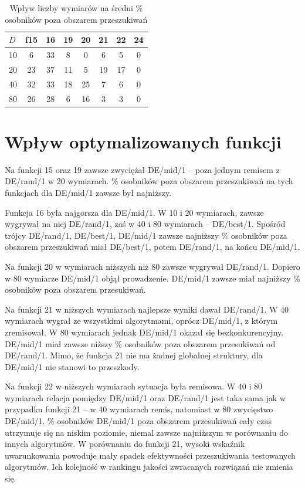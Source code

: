 \documentclass[a4paper,onecolumn,oneside,11pt,wide,floatssmall]{mwrep}
\theoremstyle{definition}
\theoremstyle{plain}%
\theoremstyle{remark}
\begin{document}
\begin{table}[H]
\centering
\begin{tabular}{ l | c | c | c | c | c | c | c }
$D$ &f15& 16& 19& 20& 21& 22& 24 \\ \hline
10              & 6 & 33 &  8 &  0 & 6 & 5 & 0 \\
20              & 23 & 37 & 11&  5 & 19 & 17 & 0 \\
40		& 32 & 33 & 18 & 25 & 7 & 6 & 0 \\
80		& 26 & 28 & 6 & 16 & 3 & 3 & 0 \\
\end{tabular}
\caption{Wpływ liczby wymiarów na średni \% osobników poza obszarem przeszukiwań}
\end{table}

\section{Wpływ optymalizowanych funkcji}

Na funkcji 15 oraz 19 zawsze zwyciężał DE/mid/1 -- poza jednym remisem z DE/rand/1 w 20 wymiarach.
\% osobników poza obszarem przeszukiwań na tych funkcjach dla DE/mid/1 zawsze był najniższy.

Funkcja 16 była najgorsza dla DE/mid/1. W 10 i 20 wymiarach, zawsze wygrywał na niej DE/rand/1,
zaś w 40 i 80 wymiarach -- DE/best/1. Spośród trójcy DE/rand/1, DE/best/1, DE/mid/1 
zawsze najniższy \% osobników poza obszarem przeszukiwań miał DE/best/1, potem DE/rand/1, na końcu
DE/mid/1. 

Na funkcji 20 w wymiarach niższych niż 80 zawsze wygrywał DE/rand/1. Dopiero w 80 wymiarze DE/mid/1
objął prowadzenie. DE/mid/1 zawsze miał najniższy \% osobników poza obszarem przesukiwań.

Na funkcji 21 w niższych wymiarach najlepsze wyniki dawał DE/rand/1. W 40 wymiarach wygrał ze 
wszystkimi algorytmami, oprócz DE/mid/1, z którym zremisował. W 80 wymiarach jednak DE/mid/1
okazał się bezkonkurencyjny. DE/mid/1 miał zawsze niższy \% osobników poza obszarem przesukiwań
od DE/rand/1. Mimo, że funkcja 21 nie ma żadnej globalnej struktury, dla DE/mid/1 nie stanowi to 
przeszkody.

Na funkcji 22 w niższych wymiarach sytuacja była remisowa. 
W 40 i 80 wymiarach relacja pomiędzy DE/mid/1 oraz DE/rand/1 jest taka sama jak w przypadku funkcji 21
-- w 40 wymiarach remis, natomiast w 80 zwycięstwo DE/mid/1. \% osobników DE/mid/1 poza obszarem 
przesukiwań cały czas utrzymuje się na niskim poziomie, niemal zawsze najniższym w porównaniu do 
innych algorytmów.
W porównaniu do funkcji 21, wysoki wskaźnik uwarunkowania powoduje mały spadek efektywności
przeszukiwania testowanych algorytmów. Ich kolejność w rankingu jakości zwracanych rozwiązań nie 
zmienia się.
\end{document}
